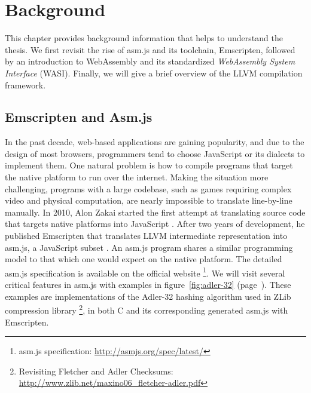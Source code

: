 \chapter{Background}
\label{chapter:background}

This chapter provides background information that helps to understand the
thesis. We first revisit the rise of asm.js and its toolchain, Emscripten,
followed by an introduction to WebAssembly and its standardized
\emph{WebAssembly System Interface} (WASI). Finally, we will give a brief
overview of the LLVM compilation framework.

\section{Emscripten and Asm.js}

In the past decade, web-based applications are gaining popularity, and due to
the design of most browsers, programmers tend to choose JavaScript or its
dialects to implement them. One natural problem is how to compile programs that
target the native platform to run over the internet. Making the situation more
challenging, programs with a large codebase, such as games requiring
complex video and physical computation, are nearly impossible to translate
line-by-line manually. In 2010, Alon Zakai started the first attempt at
translating source code that targets native platforms into JavaScript
\cite{8118483}. After two years of development, he published Emscripten that
translates LLVM intermediate representation into asm.js, a JavaScript subset
\cite{10.1145/2048147.2048224}. An asm.js program shares a similar programming
model to that which one would expect on the native platform. The detailed asm.js
specification is available on the official website
\footnote{asm.js specification: \url{http://asmjs.org/spec/latest/}}.
We will visit several critical features in asm.js with examples in
figure~\ref{fig:adler-32} (page~\pageref{fig:adler-32}). These examples are
implementations of the Adler-32 hashing algorithm used in ZLib compression
library \cite{adler32-paper} \footnote{Revisiting Fletcher and Adler Checksums:
  \\\url{http://www.zlib.net/maxino06\_fletcher-adler.pdf}}, in both C and its
corresponding generated asm.js with Emscripten.

